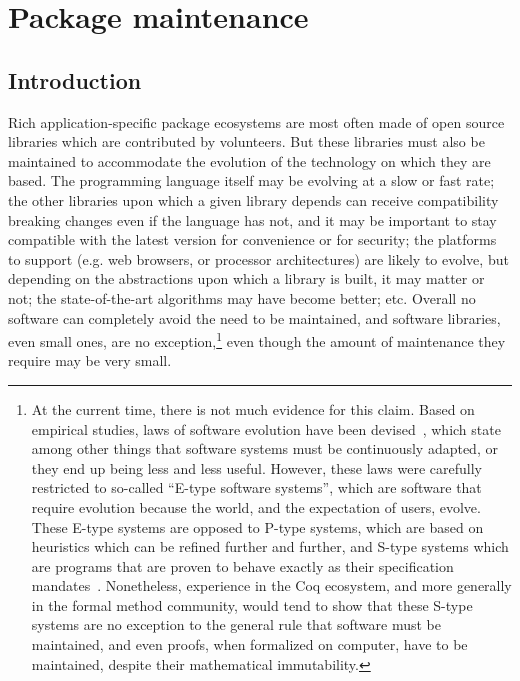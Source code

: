 \chapter{Package maintenance}

\label{chap:maintenance}

\section{Introduction}

Rich application-specific package ecosystems are most often made of open source libraries which are contributed by volunteers.
But these libraries must also be maintained to accommodate the evolution of the technology on which they are based.
The programming language itself may be evolving at a slow or fast rate; the other libraries upon which a given library depends can receive compatibility breaking changes even if the language has not, and it may be important to stay compatible with the latest version for convenience or for security; the platforms to support (e.g. web browsers, or processor architectures) are likely to evolve, but depending on the abstractions upon which a library is built, it may matter or not; the state-of-the-art algorithms may have become better; etc.
Overall no software can completely avoid the need to be maintained, and software libraries, even small ones, are no exception,\footnote{
	At the current time, there is not much evidence for this claim.
	Based on empirical studies, laws of software evolution have been devised~\cite{lehman1996laws}, which state among other things that software systems must be continuously adapted, or they end up being	less and less useful.
	However, these laws were carefully restricted to so-called ``E-type software systems'', which are software that require evolution because the world, and the expectation of users, evolve.
	These E-type systems are opposed to P-type systems, which are based on heuristics which can be refined further and further,	and S-type systems which are programs that are proven to behave	exactly as their specification mandates~\cite{lehman1980programs}.
	Nonetheless, experience in the Coq ecosystem, and more generally in the formal method community, would tend to show that these S-type systems are no exception to the general rule that software must be maintained, and even proofs, when formalized on computer, have to be maintained, despite their mathematical immutability.
}
even though the amount of maintenance they require may be very small.

